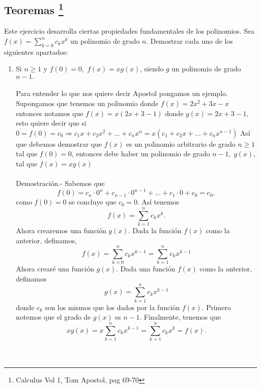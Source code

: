 \subsection[Teoremas]{Teoremas \footnote{Calculus Vol 1, Tom Apostol, pag 69-70}}

\begin{teo}
Este ejercicio desarrolla ciertas propiedades fundamentales de los polinomios. Sea $f(x)=\displaystyle\sum_{k=0}^{n} c_k x^k$ un polinomio de grado $n$. Demostrar cada uno de los siguientes apartados:
\begin{enumerate}[\bfseries a)]
\item Si $n \geq 1$ \; y \; $f(0)=0,$ $f(x)=xg(x)$, siendo $g$ un polinomio de grado $n-1.$\\\\
Para entender lo que nos quiere decir Apostol pongamos un ejemplo. Supongamos que tenemos un polinomio donde $f(x)=2x^2+3x-x$ entonces notamos que $f(x)=x(2x+3-1)$ donde $g(x)=2x+3-1$, esto quiere decir que si $0 = f(0)=c_0 \Rightarrow c_1 x + c_2 x^2 + ... + c_n x^n = x(c_1 + c_2 x + ... + c_n x^{n-1})$ 
Así que debemos demostrar que $f(x)$ es un polinomio arbitrario de grado $n \geq 1$ tal que $f(0)=0$, entonces debe haber un polinomio de grado $n-1, \; g(x)$, tal que $f(x)=xg(x)$\\\\
Demostración.- \; Sabemos que $$f(0) = c_n \cdot 0^n + c_{n-1} \cdot 0^{n-1} + ... + c_1 \cdot 0 + c_0 =c_0,$$ como $f(0)=0$ se concluye que $c_0=0$. Así tenemos $$f(x)=\displaystyle\sum_{k=1}^{n} c_k x^k.$$ Ahora crearemos una función $g(x).$ Dada la función $f(x)$ como la anterior, definamos, $$f(x)=\displaystyle\sum_{k=0}^{n} c_k x^{k-1} = \sum_{k=1}^{n} c_k x^{k-1}$$ 
Ahora crearé una función $g(x)$. Dada una función $f(x)$ como la anterior, definamos  $$g(x) = \displaystyle\sum_{k=1}^{n} c_k x^{k-1}$$
donde $c_k$ son los mismos que los dados por la función $f(x)$. Primero notemos que el grado de $g(x)$ es $n-1$. Finalmente, tenemos que $$ xg(x) = x \displaystyle\sum_{k=1}^{n} c_k x^{k-1} = \sum_{k=1}^{n} c_k x^k = f(x).$$ \\\\


\end{enumerate}
\end{teo}
